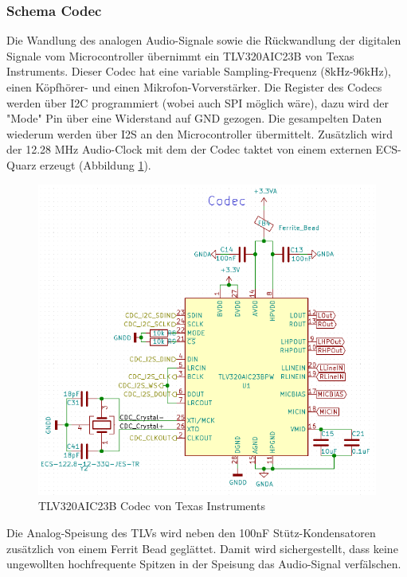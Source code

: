 \subsubsection{Schema Codec}
\label{sec:Schema_Codec}

Die Wandlung des analogen Audio-Signale sowie die Rückwandlung der digitalen Signale vom Microcontroller  übernimmt ein TLV320AIC23B von Texas Instruments. Dieser Codec hat eine variable Sampling-Frequenz (8kHz-96kHz), einen Köpfhörer- und einen Mikrofon-Vorverstärker. Die Register des Codecs werden über I2C programmiert (wobei auch SPI möglich wäre), dazu wird der "Mode" Pin über eine Widerstand auf GND gezogen. Die gesampelten Daten wiederum werden über I2S an den Microcontroller übermittelt. Zusätzlich wird der 12.28 MHz Audio-Clock mit dem der Codec taktet von einem externen ECS-Quarz erzeugt (Abbildung \ref{fig:Schema_Codec}). 

\begin{figure} [H]
\begin{center}
\includegraphics[scale=0.5]{../graphics/Schema_Codec.png}
\caption{TLV320AIC23B Codec von Texas Instruments}
\label{fig:Schema_Codec}
\end{center}
\end{figure}

Die Analog-Speisung des TLVs wird neben den 100nF Stütz-Kondensatoren zusätzlich von einem Ferrit Bead geglättet. Damit wird sichergestellt, dass keine ungewollten hochfrequente Spitzen in der Speisung das Audio-Signal verfälschen.

